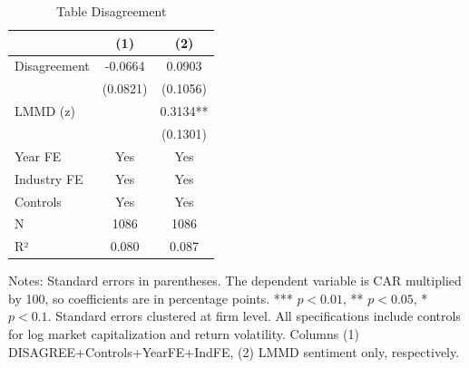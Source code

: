 \begin{table}[htbp]
\centering
\caption{Table Disagreement}
\label{tab:table_disagreement}
\begin{tabular}{lcc}
\toprule
 & (1) & (2) \\
\midrule
Disagreement & -0.0664 & 0.0903 \\
  & (0.0821) & (0.1056) \\
LMMD (z) &  & 0.3134** \\
  &  & (0.1301) \\
\midrule
Year FE & Yes & Yes \\
Industry FE & Yes & Yes \\
Controls & Yes & Yes \\
N & 1086 & 1086 \\
R² & 0.080 & 0.087 \\
\bottomrule
\end{tabular}\begin{flushleft}
\footnotesize Notes: Standard errors in parentheses. The dependent variable is CAR multiplied by 100, so coefficients are in percentage points. *** $p<0.01$, ** $p<0.05$, * $p<0.1$. Standard errors clustered at firm level. All specifications include controls for log market capitalization and return volatility. Columns (1) DISAGREE+Controls+YearFE+IndFE, (2) LMMD sentiment only, respectively.
\end{flushleft}
\end{table}